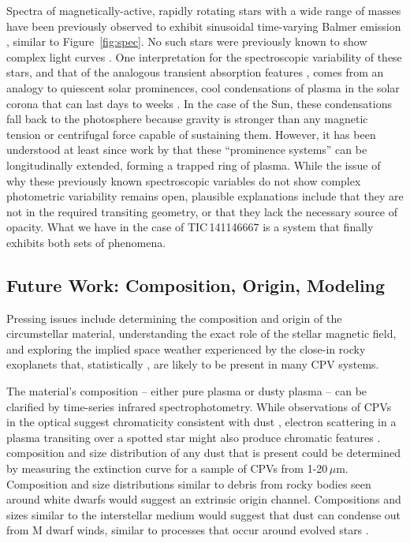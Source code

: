 \documentclass[11pt,twocolumn,tighten,linenumbers]{aastex7}
\begin{document}
Spectra of magnetically-active, rapidly rotating stars with a wide
range of masses have been previously observed to exhibit sinusoidal
time-varying Balmer emission
\citep{Donati2000,Townsend2005b,Dunstone2006,Skelly2008}, similar to
Figure~\ref{fig:spec}.  No such stars were previously known to show
complex light curves \citep{Bouma2024}.   One interpretation for the
spectroscopic variability of these stars, and that of the analogous
transient absorption features
\citep{CollierCameron1989,CollierCameron1992,Cang2020}, comes from an
analogy to quiescent solar prominences, cool condensations of plasma
in the solar corona that can last days to weeks
\citep{VialEngvold2015}.  In the case of the Sun, these condensations
fall back to the photosphere because gravity is stronger than any
magnetic tension or centrifugal force capable of sustaining them.
However, it has been understood at least since work by
\citet{Donati2000} that these ``prominence systems'' can be
longitudinally extended, forming a trapped ring of plasma.  While the
issue of why these previously known spectroscopic variables do not
show complex photometric variability remains open, plausible
explanations include that they are not in the required transiting
geometry, or that they lack the necessary source of opacity.  What we
have in the case of TIC\,141146667 is a system that finally exhibits
both sets of phenomena.


\subsection{Future Work: Composition, Origin, Modeling}

Pressing issues include determining the composition and origin of the
circumstellar material, understanding the exact role of the stellar
magnetic field, and exploring the implied space weather experienced by
the close-in rocky exoplanets that, statistically \citep{Dressing2015},
are likely to be present in many CPV systems.

The material's composition -- either pure plasma or dusty plasma --
can be clarified by time-series infrared spectrophotometry.  While
observations of CPVs in the optical suggest chromaticity consistent
with dust \citep{Tanimoto2020,Gunther2022,Koen2023}, electron
scattering in a plasma transiting over a spotted star might
also produce chromatic features \citep{Rackham2018}.   composition and
size distribution of any dust that is present could be determined by
measuring the extinction curve for a sample of CPVs from 1-20\,$\mu$m.
Composition and size distributions similar to debris from rocky bodies
seen around white dwarfs \citep{Reach2009} would suggest an extrinsic
origin channel.  Compositions and sizes similar to the interstellar
medium would suggest that dust can condense out from M dwarf winds,
similar to processes that occur around evolved stars
\citep{Marigo2008}.
\end{document}
